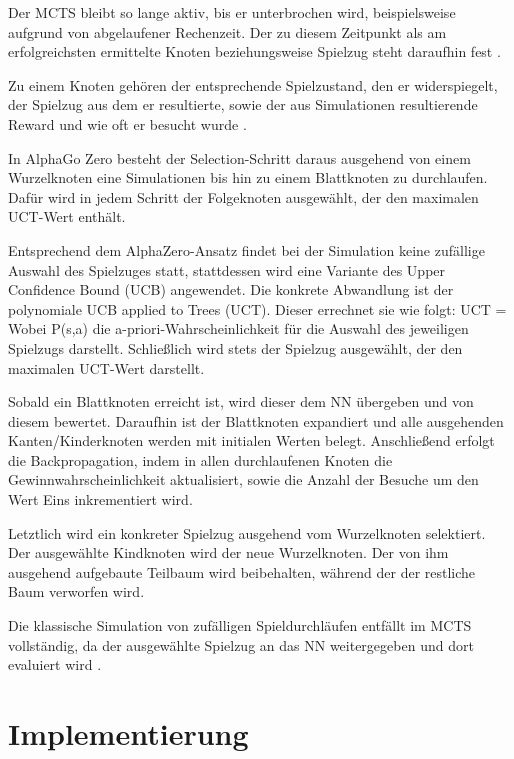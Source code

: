 \documentclass[12pt,a4paper]{article}
\begin{document}
Der MCTS bleibt so lange aktiv, bis er unterbrochen wird, beispielsweise aufgrund von abgelaufener Rechenzeit. Der zu diesem Zeitpunkt als am erfolgreichsten ermittelte Knoten beziehungsweise Spielzug steht daraufhin fest \cite{Browne2012}.

Zu einem Knoten gehören der entsprechende Spielzustand, den er widerspiegelt, der Spielzug aus dem er resultierte, sowie der aus Simulationen resultierende Reward und wie oft er besucht wurde \cite{Browne2012}.

In AlphaGo Zero besteht der Selection-Schritt daraus ausgehend von einem Wurzelknoten eine Simulationen bis hin zu einem Blattknoten zu durchlaufen. Dafür wird in jedem Schritt der Folgeknoten ausgewählt, der den maximalen UCT-Wert enthält.

Entsprechend dem AlphaZero-Ansatz findet bei der Simulation keine zufällige Auswahl des Spielzuges statt, stattdessen wird eine Variante des Upper Confidence Bound (UCB) angewendet. Die konkrete Abwandlung ist der polynomiale UCB applied to Trees (UCT). Dieser errechnet sie wie folgt:
UCT = 
Wobei P(s,a) die a-priori-Wahrscheinlichkeit für die Auswahl des jeweiligen Spielzugs darstellt.
Schließlich wird stets der Spielzug ausgewählt, der den maximalen UCT-Wert darstellt.

Sobald ein Blattknoten erreicht ist, wird dieser dem NN übergeben und von diesem bewertet. Daraufhin ist der Blattknoten expandiert und alle ausgehenden Kanten/Kinderknoten werden mit initialen Werten belegt. 
Anschließend erfolgt die Backpropagation, indem in allen durchlaufenen Knoten die Gewinnwahrscheinlichkeit aktualisiert, sowie die Anzahl der Besuche um den Wert Eins inkrementiert wird.

Letztlich wird ein konkreter Spielzug ausgehend vom Wurzelknoten selektiert. Der ausgewählte Kindknoten wird der neue Wurzelknoten. Der von ihm ausgehend aufgebaute Teilbaum wird beibehalten, während der der restliche Baum verworfen wird.

Die klassische Simulation von zufälligen Spieldurchläufen entfällt im MCTS vollständig, da der ausgewählte Spielzug an das NN weitergegeben und dort evaluiert wird \cite{Silver2017}.

\newpage

\section{Implementierung}
\end{document}
